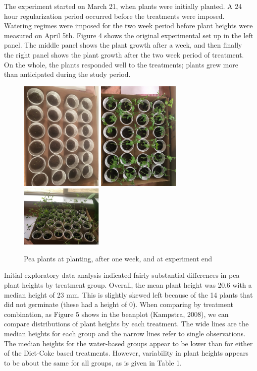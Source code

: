 \documentclass[1p,12pt]{elsarticle}\usepackage[]{graphicx}\usepackage[]{color}
\begin{document}
The experiment started on March 21, when plants were initially planted. A 24 hour regularization period occurred before the treatments were imposed. Watering regimes were imposed for the two week period before plant heights were measured on April 5th. Figure 4 shows the original experimental set up in the left panel. The middle panel shows the plant growth after a week, and then finally the right panel shows the plant growth after the two week period of treatment.  On the whole, the plants responded well to the treatments; plants grew more than anticipated during the study period. 
 \begin{figure}[h!]
 	\caption{Pea plants at planting, after one week, and at experiment end}
 	\centering
	\includegraphics[width = 4cm]{figure/initial_growth.JPG}
	\includegraphics[width = 4cm]{figure/lategrowth.JPG}
	\includegraphics[width = 4cm]{figure/2weeks.JPG}
\end{figure}

Initial exploratory data analysis indicated fairly substantial differences in pea plant heights by treatment group. Overall, the mean plant height was 20.6 with a median height of 23 mm. This is slightly skewed left because of the 14 plants that did not germinate (these had a height of 0). When comparing by treatment combination, as Figure 5 shows in the beanplot (Kampstra, 2008), we can compare distributions of plant heights by each treatment. The wide lines are the median heights for each group and the narrow lines refer to single observations. The median heights for the water-based groups appear to be lower than for either of the Diet-Coke based treatments. However, variability in plant heights appears to be about the same for all groups, as is given in Table 1. 
\end{document}
